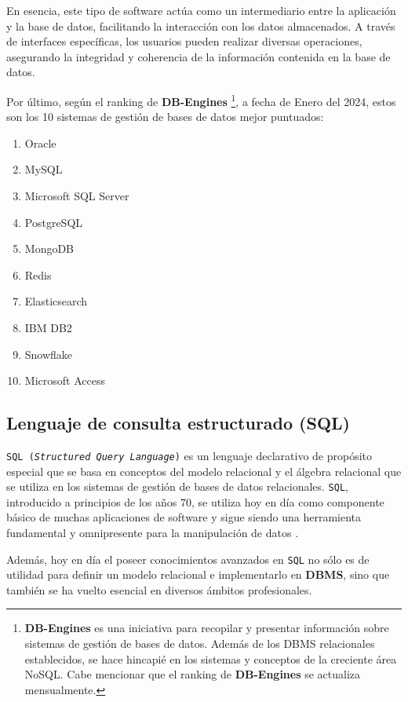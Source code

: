 En esencia, este tipo de software actúa como un intermediario entre la aplicación y la base de datos, facilitando la interacción con los datos almacenados. A través de interfaces específicas, los usuarios pueden realizar diversas operaciones, asegurando la integridad y coherencia de la información contenida en la base de datos.

Por último, según el ranking de \textbf{DB-Engines} \footnote{\textbf{DB-Engines}  es una iniciativa para recopilar y presentar información sobre sistemas de gestión de bases de datos. Además de los DBMS relacionales establecidos, se hace hincapié en los sistemas y conceptos de la creciente área NoSQL. Cabe mencionar que el ranking de \textbf{DB-Engines} se actualiza mensualmente.}, a fecha de Enero del 2024, estos son los 10 sistemas de gestión de bases de datos mejor puntuados:

\begin{enumerate}
    \item Oracle
    \item MySQL
    \item Microsoft SQL Server
    \item PostgreSQL
    \item MongoDB
    \item Redis
    \item Elasticsearch
    \item IBM DB2
    \item Snowflake
    \item Microsoft Access
\end{enumerate}

\subsection{Lenguaje de consulta estructurado (SQL) }

\texttt{SQL (\textit{Structured Query Language})} es un lenguaje declarativo de propósito especial
que se basa en conceptos del modelo relacional y el álgebra relacional que se utiliza en los sistemas de gestión de bases de datos relacionales. \texttt{SQL}, introducido a principios de los años 70, se utiliza hoy en día como componente básico de muchas aplicaciones de software y sigue siendo una herramienta fundamental y omnipresente para la manipulación de datos \cite{sql_thesis1} \cite{sql_thesis2}.

Además, hoy en día el poseer conocimientos avanzados en \texttt{SQL} no sólo es de utilidad para definir un modelo relacional e implementarlo en \textbf{DBMS}, sino que también se ha vuelto esencial en diversos ámbitos profesionales. 

